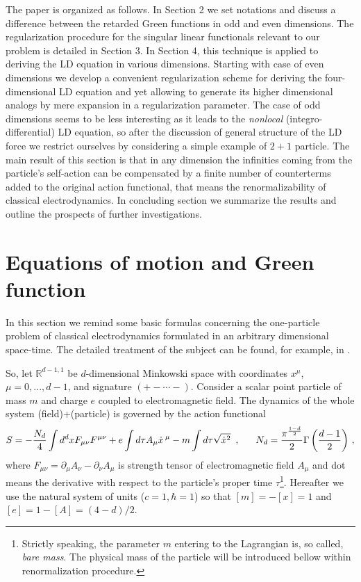 \documentclass[a4paper,12pt]{article}
\begin{document}
The paper is organized as follows. In Section 2 we set notations and discuss
a difference between the retarded Green functions in odd and even
dimensions. The regularization procedure for the singular linear functionals
relevant to our problem is detailed in Section 3. In Section 4, this
technique is applied to deriving the LD equation in various dimensions.
Starting with case of even dimensions we develop a convenient regularization
scheme for deriving the four-dimensional LD equation and yet allowing to
generate its higher dimensional analogs by mere expansion in a
regularization parameter. The case of odd dimensions seems to be less
interesting as it leads to the {\it nonlocal} (integro-differential) LD
equation, so after the discussion of general structure of the LD force we
restrict ourselves by considering a simple example of $2+1$ particle. The
main result of this section is that in any dimension the infinities coming
from the particle's self-action can be compensated by a finite number of
counterterms added to the original action functional, that means the
renormalizability of classical electrodynamics. In concluding section we
summarize the results and outline the prospects of further investigations.

\section{ Equations of motion and Green function}

In this section we remind some basic formulas concerning the one-particle
problem of classical electrodynamics formulated in an arbitrary dimensional
space-time. The detailed treatment of the subject can be found, for example,
in \cite{IS}.

So, let ${\mathbb{R}}^{d-1,1}$ be $d$-dimensional Minkowski space with
coordinates $x^\mu $, $\mu =0,...,d-1$, and signature $(+-\cdots -)$.
Consider a scalar point particle of mass $m$ and charge $e$ coupled to
electromagnetic field. The dynamics of the whole system (field)+(particle)
is governed by the action functional
\begin{equation}
S=-\frac{N_d}4\int {d^dxF_{\mu \nu }F^{\mu \nu }}+e\int {d\tau A_\mu \dot
x\,^\mu }-m\int {d\tau \sqrt{\dot x^2}}\,\,\,,\;\;\;\;\;\;N_d=\frac{\pi ^{%
\frac{1-d}2}}2\Gamma \left( \frac{d-1}2\right) \,,  \label{act}
\end{equation}
where $F_{\mu \nu }=\partial _\mu A_\nu -\partial _\nu A_\mu $ is strength
tensor of electromagnetic field $A_\mu $ and dot means the derivative with
respect to the particle's proper time $\tau $\footnote{%
Strictly speaking, the parameter $m$ entering to the Lagrangian is, so
called, {\it bare mass}. The physical mass of the particle will be
introduced bellow within renormalization procedure.}. Hereafter we use the
natural system of units ($c=1,\hbar =1$) so that $[m]=-[x]=1$ and $%
[e]=1-[A]=(4-d)/2$.
\end{document}

